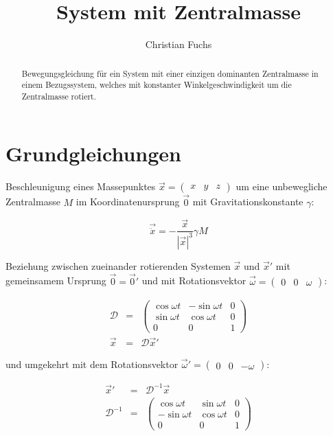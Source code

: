 \documentclass[12pt]{article}
\title{System mit Zentralmasse}
\author{Christian Fuchs}
\begin{document}
\maketitle

\begin{abstract}
Bewegungsgleichung für ein System mit einer einzigen dominanten Zentralmasse in einem Bezugssystem, welches mit konstanter Winkelgeschwindigkeit um die Zentralmasse rotiert.
\end{abstract}

\section{Grundgleichungen}

Beschleunigung eines Massepunktes $\vec{x} = \left( \begin{matrix} x & y & z \end{matrix} \right)$ um eine unbewegliche Zentralmasse $M$ im Koordinatenursprung $\vec{0}$ mit Gravitationskonstante $\gamma$:

\begin{equation}
\vec{\ddot{x}} = - \frac{\vec{x}}{\left| \vec{x} \right|^3} \gamma M \label{eq:basic}
\end{equation}

Beziehung zwischen zueinander rotierenden Systemen $\vec{x}$ und $\vec{x}'$ mit gemeinsamem Ursprung $\vec{0} = \vec{0}'$ und mit Rotationsvektor $\vec{\omega} = \left( \begin{matrix} 0 & 0 & \omega \end{matrix} \right)$:

\begin{eqnarray}
\mathcal{D} &=& \left(
\begin{matrix}
  \cos \omega t & -\sin \omega t & 0 \\
  \sin \omega t &  \cos \omega t & 0 \\
  0             &  0             & 1
\end{matrix}
\right) \nonumber \\
\vec{x}  &=& \mathcal{D} \vec{x}' \label{eq:xtoxprime}
\end{eqnarray}

\noindent und umgekehrt mit dem Rotationsvektor $\vec{\omega}' = \left( \begin{matrix} 0 & 0 & -\omega \end{matrix} \right)$:

\begin{eqnarray}
\vec{x}'  &=& \mathcal{D}^{-1} \vec{x} \nonumber \\
\mathcal{D}^{-1} &=& \left(
\begin{matrix}
  \cos \omega t &  \sin \omega t & 0 \\
 -\sin \omega t &  \cos \omega t & 0 \\
  0             &  0             & 1
\end{matrix}
\right) \nonumber
\end{eqnarray}
\end{document}
